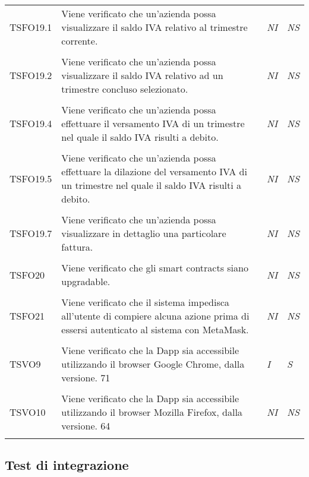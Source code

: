 \begin{longtable}{ >{\centering}p{} >{}p{}
			>{\centering}p{} >{\centering}p{}}
		\tabularnewline
		\hypertarget{TSFO19.1}{TSFO19.1} & Viene verificato che un'azienda possa 
		visualizzare il saldo IVA relativo al trimestre corrente. & 
		\textit{NI} & \textit{NS}\\ 

		\tabularnewline
		\hypertarget{TSFO19.2}{TSFO19.2} & Viene verificato che un'azienda possa 
		visualizzare il saldo IVA relativo ad un trimestre concluso selezionato. & 
		\textit{NI} & \textit{NS}\\ 

		\tabularnewline
		\hypertarget{TSFO19.4}{TSFO19.4} & Viene verificato che un'azienda possa 
		effettuare il versamento IVA di un trimestre nel quale il saldo IVA risulti a 
		debito. & \textit{NI} & \textit{NS}\\ 

		\tabularnewline
		\hypertarget{TSFO19.5}{TSFO19.5} & Viene verificato che un'azienda possa 
		effettuare la dilazione del versamento IVA di un trimestre nel quale il saldo 
		IVA risulti a debito. & \textit{NI} & \textit{NS}\\ 

		\tabularnewline
		\hypertarget{TSFO19.7}{TSFO19.7} & Viene verificato che un'azienda possa 
		visualizzare in dettaglio una particolare fattura. & \textit{NI} & \textit{NS}\\ 

		\tabularnewline
		\hypertarget{TSFO20}{TSFO20} & Viene verificato che gli smart contracts siano 
		upgradable. & \textit{NI} & \textit{NS}\\ 

		\tabularnewline
		\hypertarget{TSFO21}{TSFO21} & Viene verificato che il sistema impedisca 
		all'utente di compiere alcuna azione prima di essersi autenticato al sistema con 
		MetaMask. & \textit{NI} & \textit{NS}\\ 

		\tabularnewline
		\hypertarget{TSVO9}{TSVO9} & Viene verificato che la Dapp sia accessibile 
		utilizzando il browser Google Chrome, dalla versione. 71 & 
		\textit{I} & \textit{S}\\

		\tabularnewline
		\hypertarget{TSVO10}{TSVO10} & Viene verificato che la Dapp sia accessibile 
		utilizzando il browser Mozilla Firefox, dalla versione. 64 & \textit{NI} & \textit{NS}\\  
		\tabularnewline
		\end{longtable}


\subsection{Test di integrazione}
\pagebreak
